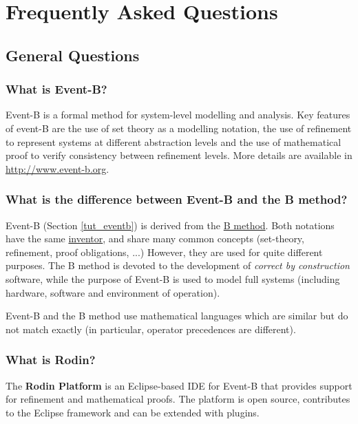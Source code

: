 \chapter{Frequently Asked Questions}
\label{faq}

\section{General Questions}

\subsection{What is Event-B?}

Event-B is a formal method for system-level modelling and analysis. Key features of event-B are the use of set theory as a modelling notation, the use of refinement to represent systems at different abstraction levels and the use of mathematical proof to verify consistency between refinement levels.
More details are available in \url{http://www.event-b.org}.

\subsection{What is the difference between Event-B and the B method?}

Event-B (Section \ref{tut_eventb}) is derived from the \href{http://en.wikipedia.org/wiki/B-Method}{B method}. Both notations have the same \href{http://en.wikipedia.org/wiki/Jean-Raymond_Abrial}{inventor}, and share many common concepts (set-theory, refinement, proof obligations, ...) However, they are used for quite different purposes. The B method is devoted to the development of \textit{correct by construction} software, while the purpose of Event-B is used to model full systems (including hardware, software and environment of operation).

Event-B and the B method use mathematical languages which are similar but do not match exactly (in particular, operator precedences are different).

\subsection{What is Rodin?}

The \textbf{Rodin Platform} is an Eclipse-based IDE for Event-B that provides support for refinement and mathematical proofs. The platform is open source, contributes to the Eclipse framework and can be extended with plugins.


